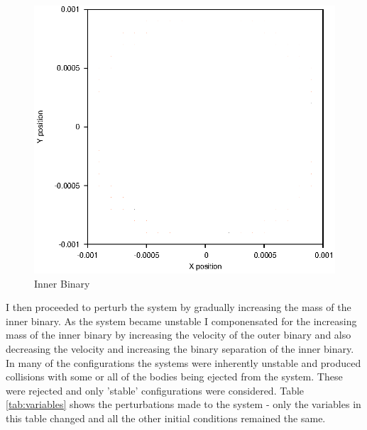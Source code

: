 \documentclass[a4paper,12pt]{article}
\begin{document}
\begin{figure}[H]
\centering
\includegraphics[width=.9\textwidth]{./2016results/innerbinary/Orbit.eps}
\caption{Inner Binary}
\label{fig:innerbinary}
\end{figure}
I then proceeded to perturb the system by gradually increasing the mass of the inner binary. As the system became unstable I componensated for
the increasing mass of the inner binary by increasing the velocity of the outer binary and also decreasing the velocity and increasing the binary 
separation of the inner binary. In many of the configurations the systems were inherently unstable and produced collisions with some 
or all of the bodies being ejected from the system. These were rejected and only 'stable' configurations were considered.
Table \ref{tab:variables} shows the perturbations made to the system - only the variables in this table changed and all the other initial
conditions remained the same.
\end{document}
